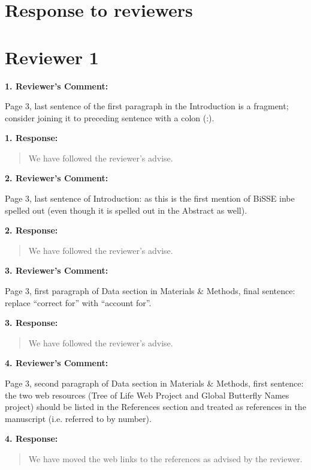 \documentclass[]{article}
\date{}
\begin{document}
\section{Response to reviewers}\label{response-to-reviewers}

\section{Reviewer 1}\label{reviewer-1}

\textbf{1. Reviewer's Comment:}

 Page 3, last sentence of the first paragraph in the Introduction is a fragment; consider joining it to
preceding sentence with a colon (:).


\textbf{1. Response:}

\begin{quote}
\color{blue}
We have followed the reviewer's advise.
\end{quote}

\textbf{2. Reviewer's Comment:}

Page 3, last sentence of Introduction: as this is the first mention of BiSSE inbe spelled out (even though it is spelled out in the Abstract as well).


\textbf{2. Response:}

\begin{quote}
\color{blue}
We have followed the reviewer's advise.
\end{quote}

\textbf{3. Reviewer's Comment:}

 Page 3, first paragraph of Data section in Materials & Methods, final sentence: replace “correct for”
with “account for”.


\textbf{3. Response:}

\begin{quote}
\color{blue}
We have followed the reviewer's advise.
\end{quote}

\textbf{4. Reviewer's Comment:}

Page 3, second paragraph of Data section in Materials & Methods, first sentence: the two web
resources (Tree of Life Web Project and Global Butterfly Names project) should be listed in the
References section and treated as references in the manuscript (i.e. referred to by number).


\textbf{4. Response:}

\begin{quote}
\color{blue}
We have moved the web links to the references as advised by the reviewer.
\end{quote}
\end{document}
